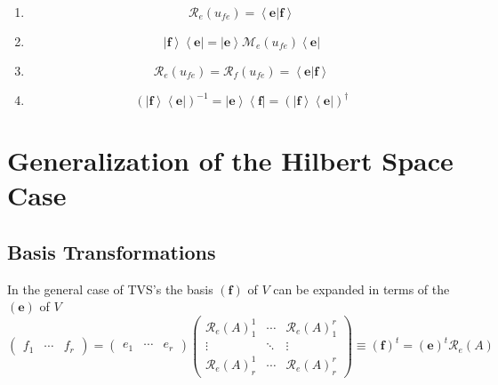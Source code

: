 \documentclass[aps,preprint]{revtex4}
\begin{document}
\begin{enumerate}
\begin{enumerate}
\item 
\begin{equation}
\mathcal{R}_{e}\left( u_{fe}\right) =\left\langle \left. \boldsymbol{e}%
\right\vert \boldsymbol{f}\right\rangle
\end{equation}

\item 
\begin{equation}
\left\vert \boldsymbol{f}\right\rangle \left\langle \boldsymbol{e}%
\right\vert =\left\vert \boldsymbol{e}\right\rangle \mathcal{M}_{e}\left(
u_{fe}\right) \left\langle \boldsymbol{e}\right\vert
\end{equation}

\item 
\begin{equation}
\mathcal{R}_{e}\left( u_{fe}\right) =\mathcal{R}_{f}\left( u_{fe}\right)
=\left\langle \left. \boldsymbol{e}\right\vert \boldsymbol{f}\right\rangle
\end{equation}

\item 
\begin{equation}
\left( \left\vert \boldsymbol{f}\right\rangle \left\langle \boldsymbol{e}%
\right\vert \right) ^{-1}=\left\vert \boldsymbol{e}\right\rangle
\left\langle \boldsymbol{f}\right\vert =\left( \left\vert \boldsymbol{f}%
\right\rangle \left\langle \boldsymbol{e}\right\vert \right) ^{\dagger }
\end{equation}
\end{enumerate}
\end{enumerate}

\section{Generalization of the Hilbert Space Case \label{Generalization of
Hilbert Space Case}}

\subsection{Basis Transformations}

In the general case of TVS's the basis $\left( \boldsymbol{f}\right) $ of $V$
can be expanded in terms of the $\left( \boldsymbol{e}\right) $ of $V$ 
\begin{equation}
\left( 
\begin{array}{ccc}
f_{1} & \cdots & f_{r}%
\end{array}%
\right) =\left( 
\begin{array}{ccc}
e_{1} & \cdots & e_{r}%
\end{array}%
\right) \left( 
\begin{array}{ccc}
\mathcal{R}_{e}\left( A\right) _{1}^{1} & \cdots & \mathcal{R}_{e}\left(
A\right) _{1}^{r} \\ 
\vdots & \ddots & \vdots \\ 
\mathcal{R}_{e}\left( A\right) _{r}^{1} & \cdots & \mathcal{R}_{e}\left(
A\right) _{r}^{r}%
\end{array}%
\right) \equiv \left( \boldsymbol{f}\right) ^{t}=\left( \boldsymbol{e}%
\right) ^{t}\mathcal{R}_{e}\left( A\right)
\end{equation}
\end{document}
